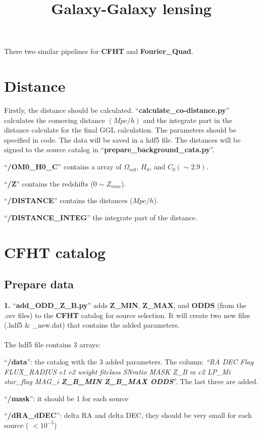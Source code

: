 \documentclass{article}
\begin{document}
\title{Galaxy-Galaxy lensing}

There two similar pipelines for \textbf{CFHT} and \textbf{Fourier\_Quad}.

\section{Distance}
Firstly, the distance should be calculated. ``\textbf{calculate\_co-distance.py}'' calculates the comoving distance $(Mpc/h)$ and the integrate part in the distance calculate for the final GGL calculation. 
The parameters should be specified in code. The data will be saved in a hdf5 file. The distances will be signed to the source catalog in ``\textbf{prepare\_background\_cata.py}''.

\noindent``\textbf{/OM0\_H0\_C}'' contains a array of $\Omega_{m0}$, $H_0$, and $C_0(\sim 2.9)$.

\noindent``\textbf{/Z}'' contains the redshifts ($0 \sim Z_{max}$).

\noindent``\textbf{/DISTANCE}'' contains the distances ($Mpc/h$).

\noindent``\textbf{/DISTANCE\_INTEG}'' the integrate part of the distance.

\section{CFHT catalog}

\subsection{Prepare data}
\textbf{1.} ``\textbf{add\_ODD\_Z\_B.py}'' adds \textbf{Z\_MIN}, \textbf{Z\_MAX}, and \textbf{ODDS} (from the .csv files) to the \textbf{CFHT} catalog for source selection.
It will create two new files (.hdf5 \& \_new.dat) that contains the added parameters.
\\ \hspace*{\fill} \\
\noindent The hdf5 file contains 3 arrays:

\noindent``\textbf{/data}'': the catalog with the 3 added parameters. The column: \emph{``RA  DEC  Flag  FLUX\_RADIUS  e1  e2  weight  fitclass   SNratio  MASK  Z\_B  m  c2  LP\_Mi  star\_flag  MAG\_i  \textbf{Z\_B\_MIN  Z\_B\_MAX  ODDS}}''. The last three are added.

\noindent``\textbf{/mask}'': it should be 1 for each source

\noindent``\textbf{/dRA\_dDEC}'': delta RA and delta DEC, they should be very small for each source ( $< 10^{-5}$)
\\ \hspace*{\fill} \\
\end{document}
